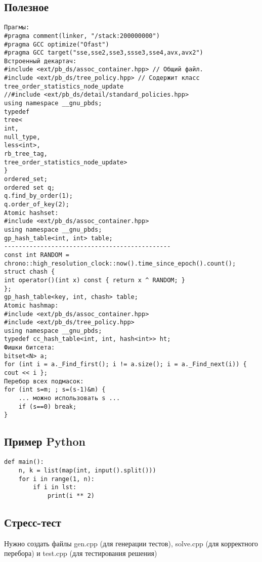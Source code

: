 \documentclass[14pt,fleqn]{article}
\begin{document}
\subsection{Полезное}

\begin{Verbatim}[tabsize=4]
Прагмы:
#pragma comment(linker, "/stack:200000000")
#pragma GCC optimize("Ofast")
#pragma GCC target("sse,sse2,sse3,ssse3,sse4,avx,avx2")
Встроенный декартач:
#include <ext/pb_ds/assoc_container.hpp> // Общий файл.
#include <ext/pb_ds/tree_policy.hpp> // Содержит класс tree_order_statistics_node_update
//#include <ext/pb_ds/detail/standard_policies.hpp>
using namespace __gnu_pbds;
typedef
tree<
int,
null_type,
less<int>,
rb_tree_tag,
tree_order_statistics_node_update>
}
ordered_set;
ordered set q;
q.find_by_order(1);
q.order_of_key(2);
Atomic hashset:
#include <ext/pb_ds/assoc_container.hpp>
using namespace __gnu_pbds;
gp_hash_table<int, int> table;
----------------------------------------------
const int RANDOM = chrono::high_resolution_clock::now().time_since_epoch().count();
struct chash {
int operator()(int x) const { return x ^ RANDOM; }
};
gp_hash_table<key, int, chash> table;
Atomic hashmap:
#include <ext/pb_ds/assoc_container.hpp>
#include <ext/pb_ds/tree_policy.hpp>
using namespace __gnu_pbds;
typedef cc_hash_table<int, int, hash<int>> ht;
Фишки битсета:
bitset<N> a;
for (int i = a._Find_first(); i != a.size(); i = a._Find_next(i)) { cout << i };
Перебор всех подмасок:
for (int s=m; ; s=(s-1)&m) {
	... можно использовать s ...
	if (s==0) break;
}

\end{Verbatim}

\subsection{Пример Python}
\begin{Verbatim}[tabsize=4]
def main():
	n, k = list(map(int, input().split()))
	for i in range(1, n):
		if i in lst:
			print(i ** 2)

\end{Verbatim}

\subsection{Стресс-тест}

Нужно создать файлы gen.cpp (для генерации тестов), solve.cpp (для корректного перебора) и test.cpp (для тестирования решения)
\end{document}
